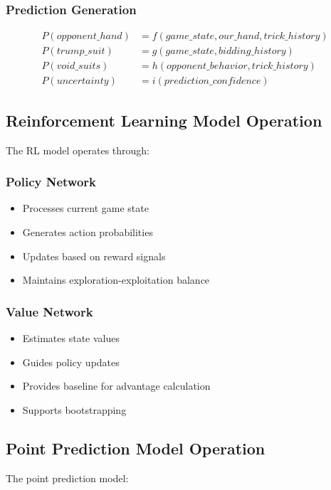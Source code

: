 \documentclass[conference]{IEEEtran}
\begin{document}
\subsubsection{Prediction Generation}
\begin{align}
P(opponent\_hand) &= f(game\_state, our\_hand, trick\_history) \\
P(trump\_suit) &= g(game\_state, bidding\_history) \\
P(void\_suits) &= h(opponent\_behavior, trick\_history) \\
P(uncertainty) &= i(prediction\_confidence)
\end{align}

\subsection{Reinforcement Learning Model Operation}

The RL model operates through:

\subsubsection{Policy Network}
\begin{itemize}
    \item Processes current game state
    \item Generates action probabilities
    \item Updates based on reward signals
    \item Maintains exploration-exploitation balance
\end{itemize}

\subsubsection{Value Network}
\begin{itemize}
    \item Estimates state values
    \item Guides policy updates
    \item Provides baseline for advantage calculation
    \item Supports bootstrapping
\end{itemize}

\subsection{Point Prediction Model Operation}

The point prediction model:
\end{document}
